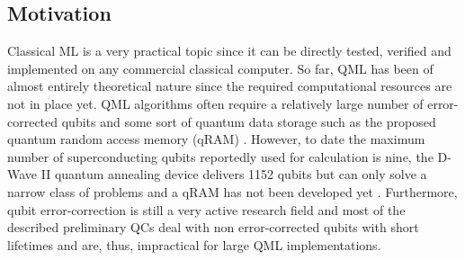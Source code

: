 \documentclass[a4paper]{article}
\newcommand*{\0}{$\ket{0}$}
\newcommand*{\1}{$\ket{1}$}
\begin{document}






\newpage

\subsection{Motivation}
\label{subsec:motivation}

Classical ML is a very practical topic since it can be directly tested, verified and implemented on any commercial classical computer. So far, QML has been of almost entirely theoretical nature since the required computational resources are not in place yet. QML algorithms often require a relatively large number of error-corrected qubits and some sort of quantum data storage such as the proposed quantum random access memory (qRAM) \citep{qRAM}. However, to date the maximum number of superconducting qubits reportedly used for calculation is nine, the D-Wave II quantum annealing device delivers 1152 qubits but can only solve a narrow class of problems and a qRAM has not been developed yet \citep{hydrogensimulation, dwave2}. Furthermore, qubit error-correction is still a very active research field and most of the described preliminary QCs deal with non error-corrected qubits with short lifetimes and are, thus, impractical for large QML implementations.
\end{document}
